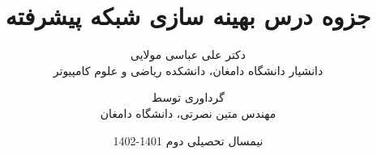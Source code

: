 \documentclass[a4paper,12pt]{book}
\begin{document}
\author{دکتر علی عباسی مولایی\\
	دانشیار دانشگاه دامغان، دانشکده ریاضی و علوم کامپیوتر  \\ 
	\and
	 گرداوری توسط \\
	  مهندس متین نصرتی، دانشگاه دامغان
  }
\title{جزوه درس بهینه سازی شبکه پیشرفته}
\date{نیمسال تحصیلی دوم 1401-1402}
\maketitle
\frontmatter

\tableofcontents

\mainmatter




\backmatter
\end{document}
